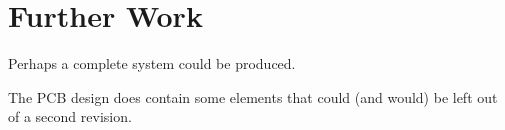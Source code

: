 \section{Further Work}
Perhaps a complete system could be produced.

The PCB design does contain some elements that could (and would) be left out of a second revision.
